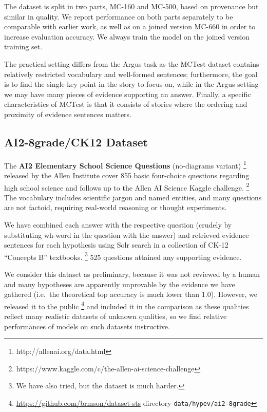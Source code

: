 \documentclass[11pt]{article}
\begin{document}
The dataset is split in two parts, MC-160 and MC-500, based on provenance but
similar in quality.
We report performance on both parts separately to be comparable with earlier
work, as well as on a joined version MC-660 in order to increase evaluation
accuracy.  We always train the model on the joined version training set.

The practical setting differs from the Argus task as the MCTest dataset contains
relatively restricted vocabulary and well-formed sentences; furthermore,
the goal is to find the single key point in the story to focus on, while
in the Argus setting we may have many pieces of evidence supporting an answer.
Finally, a specific characteristics of MCTest is that it consists of stories
where the ordering and proximity of evidence sentences matters.


\subsection{AI2-8grade/CK12 Dataset}

The \textbf{AI2 Elementary School Science Questions} (no-diagrams variant)%
\footnote{http://allenai.org/data.html} released by the Allen Institute
cover 855 basic four-choice questions regarding high school science
and follows up to the Allen AI Science Kaggle challenge.%
\footnote{https://www.kaggle.com/c/the-allen-ai-science-challenge}
The vocabulary includes scientific jargon and named entities, and many questions
are not factoid, requiring real-world reasoning or thought experiments.

We have combined each answer with the respective question (crudely by
substituting wh-word in the question with the answer) and retrieved
evidence sentences for each hypothesis using Solr search in a collection
of CK-12 ``Concepts B'' textbooks.%
\footnote{We have also tried, but the dataset is much harder.}
525 questions attained any supporting evidence.

We consider this dataset as preliminary, because it was not reviewed
by a human and many hypotheses are apparently unprovable by the evidence
we have gathered (i.e.\ the theoretical top accuracy is much lower
than 1.0).  However, we released it to the public%
\footnote{\url{https://github.com/brmson/dataset-sts} directory \texttt{data/hypev/ai2-8grade}}
and included it in the comparison as these
qualities reflect many realistic datasets of unknown qualities, so
we find relative performances of models on such datasets instructive.
\end{document}
